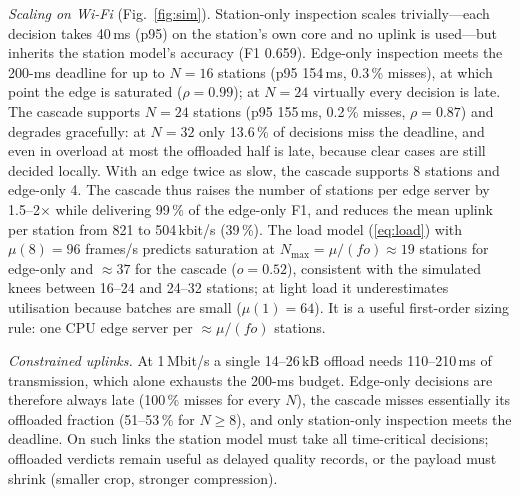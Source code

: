 \emph{Scaling on Wi-Fi} (Fig.~\ref{fig:sim}). Station-only inspection scales trivially---each decision takes 40\,ms (p95) on the station's own core and no uplink is used---but inherits the station model's accuracy (F1 0.659). Edge-only inspection meets the 200-ms deadline for up to $N=16$ stations (p95 154\,ms, 0.3\,\% misses), at which point the edge is saturated ($\rho=0.99$); at $N=24$ virtually every decision is late. The cascade supports $N=24$ stations (p95 155\,ms, 0.2\,\% misses, $\rho=0.87$) and degrades gracefully: at $N=32$ only 13.6\,\% of decisions miss the deadline, and even in overload at most the offloaded half is late, because clear cases are still decided locally. With an edge twice as slow, the cascade supports 8 stations and edge-only 4. The cascade thus raises the number of stations per edge server by 1.5--2$\times$ while delivering 99\,\% of the edge-only F1, and reduces the mean uplink per station from 821 to 504\,kbit/s (39\,\%). The load model (\ref{eq:load}) with $\mu(8)=96$ frames/s predicts saturation at $N_{\max}=\mu/(fo)\approx19$ stations for edge-only and $\approx37$ for the cascade ($o=0.52$), consistent with the simulated knees between 16--24 and 24--32 stations; at light load it underestimates utilisation because batches are small ($\mu(1)=64$). It is a useful first-order sizing rule: one CPU edge server per $\approx\!\mu/(fo)$ stations.

\emph{Constrained uplinks.} At 1\,Mbit/s a single 14--26\,kB offload needs 110--210\,ms of transmission, which alone exhausts the 200-ms budget. Edge-only decisions are therefore always late (100\,\% misses for every $N$), the cascade misses essentially its offloaded fraction (51--53\,\% for $N\ge8$), and only station-only inspection meets the deadline. On such links the station model must take all time-critical decisions; offloaded verdicts remain useful as delayed quality records, or the payload must shrink (smaller crop, stronger compression).
